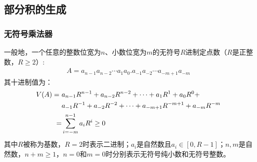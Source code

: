 \subsection{部分积的生成}

\subsubsection{无符号乘法器}

一般地，一个任意的整数位宽为$n$、小数位宽为$m$的无符号$R$进制定点数（$R$是正整数，$R \geq 2$）:
\begin{equation}
\begin{split}
   A = a_{n-1} a_{n-2} \cdots a_1 a_0 . a_{-1} a_{-2} \cdots a_{-m+1} a_{-m}
\end{split}
\label{EM:Eq:unsigned_fixed_Binary}
\end{equation}
其十进制值为：
\begin{align}
    V(A) = \ & a_{n-1}  R^{n-1} + a_{n-2}  R^{n-2} + \cdots + a_1  R^1 + a_0  R^0 + \notag \\
    & a_{-1}  R^{-1} + a_{-2}  R^{-2} + \cdots + a_{-m+1}  R^{-m+1} + a_{-m}  R^{-m} \notag \\
    = & \sum_{i=-m}^{n-1} a_i  R^i \ge 0
\label{EM:Eq:unsigned_fixed_Decimal}
\end{align}
其中$R$被称为基数，$R=2$时表示二进制；$a_i$是自然数且$a_i \in [0,R-1]$；$n,m$是自然数，$n+m \ge 1$，$n=0$和$m=0$时分别表示无符号纯小数和无符号整数。

